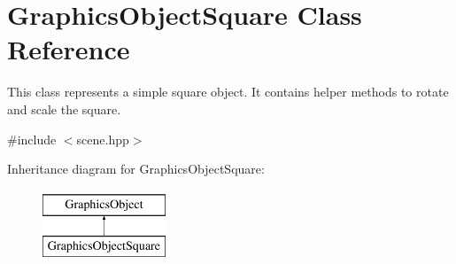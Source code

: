 \hypertarget{class_graphics_object_square}{}\section{Graphics\+Object\+Square Class Reference}
\label{class_graphics_object_square}


This class represents a simple square object. It contains helper methods to rotate and scale the square.  




{\ttfamily \#include $<$scene.\+hpp$>$}

Inheritance diagram for Graphics\+Object\+Square\+:\begin{figure}[H]
\begin{center}
\leavevmode
\includegraphics[height=2.000000cm]{class_graphics_object_square}
\end{center}
\end{figure}

